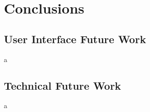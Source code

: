 \chapter{Conclusions}

\section{User Interface Future Work}\label{user-interface-future-work}

a

\section{Technical Future Work}\label{technical-future-work}

a
